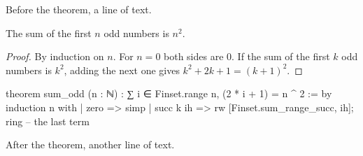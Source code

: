 Before the theorem, a line of text.
\begin{leantheorem}[decl=sum_odd, url=https://example.org/sum_odd]
\begin{theorem}
The sum of the first $n$ odd numbers is $n^2$.
\end{theorem}
\begin{proof}
By induction on $n$. For $n = 0$ both sides are $0$. If the sum of the first
$k$ odd numbers is $k^2$, adding the next one gives $k^2 + 2k + 1 = (k+1)^2$.
\end{proof}
\begin{leancode}
theorem sum_odd (n : ℕ) :
    ∑ i ∈ Finset.range n, (2 * i + 1) = n ^ 2 := by
  induction n with
  | zero => simp
  | succ k ih => rw [Finset.sum_range_succ, ih]; ring -- the last term
\end{leancode}
\end{leantheorem}
After the theorem, another line of text.
